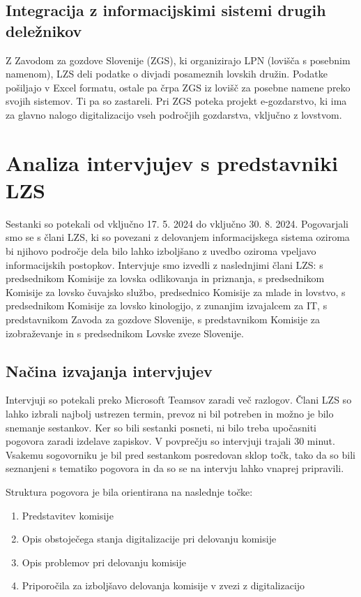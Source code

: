 \documentclass[a4paper,12pt,openright]{book}
\begin{document}
\section{Integracija z informacijskimi sistemi drugih deležnikov}

Z Zavodom za gozdove Slovenije (ZGS), ki organizirajo LPN (lovišča s posebnim namenom), LZS deli podatke o divjadi posameznih lovskih družin.
Podatke pošiljajo v Excel formatu, ostale pa črpa ZGS iz lovišč za posebne namene preko svojih sistemov. 
Ti pa so zastareli.
Pri ZGS poteka projekt e-gozdarstvo, ki ima za glavno nalogo digitalizacijo vseh področjih gozdarstva, vključno z lovstvom.







\chapter{Analiza intervjujev s predstavniki LZS}
\label{analiza_intervjujev}

Sestanki so potekali od vključno 17. 5. 2024 do vključno 30. 8. 2024. 
Pogovarjali smo se s člani LZS, ki so povezani z delovanjem informacijskega sistema oziroma bi njihovo področje dela bilo lahko izboljšano z uvedbo oziroma vpeljavo informacijskih postopkov.
Intervjuje smo izvedli z naslednjimi člani LZS: s predsednikom Komisije za lovska odlikovanja in priznanja, s predsednikom Komisije za lovsko čuvajsko službo, predsednico Komisije za mlade in lovstvo, s predsednikom Komisije za lovsko kinologijo, z zunanjim izvajalcem za IT, s predstavnikom Zavoda za gozdove Slovenije, s predstavnikom Komisije za izobraževanje in s predsednikom Lovske zveze Slovenije. 

\section{Načina izvajanja intervjujev}

Intervjuji so potekali preko Microsoft Teamsov zaradi več razlogov. 
Člani LZS so lahko izbrali najbolj ustrezen termin, prevoz ni bil potreben in možno je bilo snemanje sestankov.
Ker so bili sestanki posneti, ni bilo treba upočasniti pogovora zaradi izdelave zapiskov.
V povprečju so intervjuji trajali 30 minut.
Vsakemu sogovorniku je bil pred sestankom posredovan sklop točk, tako da so bili seznanjeni s tematiko pogovora in da so se na intervju lahko vnaprej pripravili. 

Struktura pogovora je bila orientirana na naslednje točke:
\begin{enumerate}
    \item Predstavitev komisije
    \item Opis obstoječega stanja digitalizacije pri delovanju komisije
    \item Opis problemov pri delovanju komisije
    \item Priporočila za izboljšavo delovanja komisije v zvezi z digitalizacijo
\end{enumerate}
\end{document}
